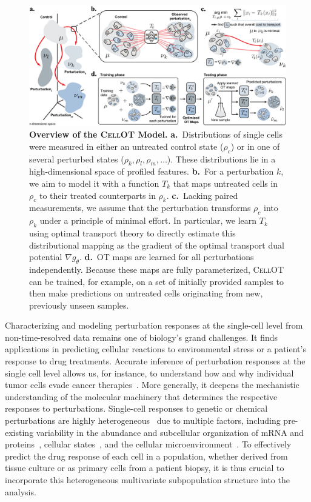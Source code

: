 \begin{figure}
    \centering
    \includegraphics[width=\textwidth]{figures/fig_overview_cellot.pdf}
    \caption{\textbf{Overview of the \textsc{CellOT} Model.} \textbf{a.}~Distributions of single cells were measured in either an untreated control state ($\rho_c$) or in one of several perturbed states ($\rho_k, \rho_l, \rho_m,  \ldots$). These distributions lie in a high-dimensional space of profiled features. \textbf{b.}~For a perturbation $k$, we aim to model it with a function $T_k$ that maps untreated cells in $\rho_c$ to their treated counterparts in $\rho_k$. \textbf{c.}~Lacking paired measurements, we assume that the perturbation transforms $\rho_c$ into $\rho_k$ under a principle of minimal effort. In particular, we learn $T_k$ using optimal transport theory to directly estimate this distributional mapping as the gradient of the optimal transport dual potential $\nabla g_\theta$.
    \textbf{d.}~OT maps are learned for all perturbations independently. Because these maps are fully parameterized, \textsc{CellOT} can be trained, for example, on a set of initially provided samples to then make predictions on untreated cells originating from new, previously unseen samples.}
    \label{fig:overview_cellot}
\end{figure}

Characterizing and modeling perturbation responses at the single-cell level from non-time-resolved data remains one of biology's grand challenges. It finds applications in predicting cellular reactions to environmental stress or a patient's response to drug treatments. Accurate inference of perturbation responses at the single cell level allows us, for instance, to understand how and why individual tumor cells evade cancer therapies~\citep{frangieh2021multimodal}. More generally, it deepens the mechanistic understanding of the molecular machinery that determines the respective responses to perturbations. Single-cell responses to genetic or chemical perturbations are  highly heterogeneous~\citep{liberali2014hierarchical} due to multiple factors, including pre-existing variability in the abundance and subcellular organization of mRNA and proteins~\citep{battich2013image, battich2015control, gut2018multiplexed, shaffer2017rare}, cellular states~\citep{kramer2019cellular}, and the cellular microenvironment~\citep{snijder2009population}. To effectively predict the drug response of each cell in a  population, whether derived from tissue culture or as primary cells from a patient biopsy, it is thus crucial to incorporate this heterogeneous multivariate subpopulation structure into the analysis.


